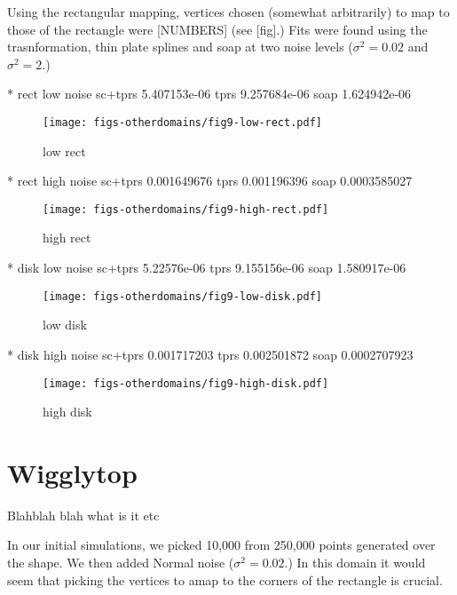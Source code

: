 \documentclass[a4paper,10pt]{amsart}
\begin{document}
Using the rectangular mapping, vertices chosen (somewhat arbitrarily) to map to those of the rectangle were [NUMBERS] (see [fig].) Fits were found using the trasnformation, thin plate splines and soap at two noise levels ($\sigma^2=0.02$ and $\sigma^2=2$.)

* rect low noise
sc+tprs 5.407153e-06 
tprs 9.257684e-06 
soap 1.624942e-06 


\begin{figure}
\centering
\texttt{[image: figs-otherdomains/fig9-low-rect.pdf]} \\
\caption{low rect}
\label{fig9-low-rect}
\end{figure}



* rect high noise
sc+tprs 0.001649676 
tprs 0.001196396 
soap 0.0003585027 

\begin{figure}
\centering
\texttt{[image: figs-otherdomains/fig9-high-rect.pdf]} \\
\caption{high rect}
\label{fig9-high-rect}
\end{figure}



* disk low noise
sc+tprs 5.22576e-06 
tprs 9.155156e-06 
soap 1.580917e-06 

\begin{figure}
\centering
\texttt{[image: figs-otherdomains/fig9-low-disk.pdf]} \\
\caption{low disk}
\label{fig9-low-disk}
\end{figure}



* disk high noise
sc+tprs 0.001717203 
tprs 0.002501872 
soap 0.0002707923 

\begin{figure}
\centering
\texttt{[image: figs-otherdomains/fig9-high-disk.pdf]} \\
\caption{high disk}
\label{fig9-high-disk}
\end{figure}





\section{Wigglytop}


Blahblah blah what is it etc

In our initial simulations, we picked 10,000 from 250,000 points generated over the shape. We then added Normal noise ($\sigma^2=0.02$.) In this domain it would seem that picking the vertices to amap to the corners of the rectangle is crucial.
\end{document}
